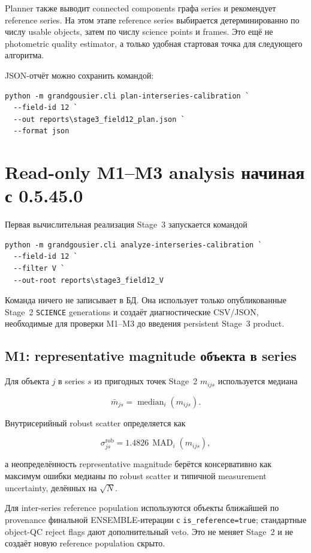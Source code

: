 Planner также выводит connected components графа series и рекомендует reference series. На этом этапе reference series выбирается детерминированно по числу usable objects, затем по числу science points и frames. Это ещё не photometric quality estimator, а только удобная стартовая точка для следующего алгоритма.

JSON-отчёт можно сохранить командой:

\begin{lstlisting}
python -m grandgousier.cli plan-interseries-calibration `
  --field-id 12 `
  --out reports\stage3_field12_plan.json `
  --format json
\end{lstlisting}

\section{Read-only M1--M3 analysis начиная с 0.5.45.0}

Первая вычислительная реализация Stage~3 запускается командой

\begin{lstlisting}
python -m grandgousier.cli analyze-interseries-calibration `
  --field-id 12 `
  --filter V `
  --out-root reports\stage3_field12_V
\end{lstlisting}

Команда ничего не записывает в БД. Она использует только опубликованные Stage~2 \texttt{SCIENCE} generations и создаёт диагностические CSV/JSON, необходимые для проверки M1--M3 до введения persistent Stage~3 product.

\subsection{M1: representative magnitude объекта в series}

Для объекта $j$ в series $s$ из пригодных точек Stage~2 $m_{ijs}$ используется медиана

\[
  \bar m_{js}=\operatorname{median}_i(m_{ijs}).
\]

Внутрисерийный robust scatter определяется как

\[
  \sigma_{js}^{\mathrm{rob}}=1.4826\,\operatorname{MAD}_i(m_{ijs}),
\]

а неопределённость representative magnitude берётся консервативно как максимум ошибки медианы по robust scatter и типичной measurement uncertainty, делённых на $\sqrt{N}$.

Для inter-series reference population используются объекты ближайшей по provenance финальной ENSEMBLE-итерации с \texttt{is\_reference=true}; стандартные object-QC reject flags дают дополнительный veto. Это не меняет Stage~2 и не создаёт новую reference population скрыто.

